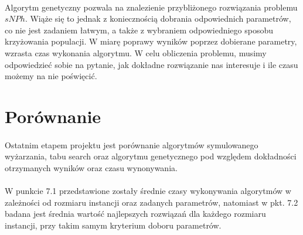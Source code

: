\documentclass[wide,a4paper,titlepage,12pt] {article}
\begin{document}
\paragraph{}
Algorytm genetyczny pozwala na znalezienie przybliżonego rozwiązania problemu $sNPh$. Wiąże się to jednak z koniecznością dobrania odpowiednich parametrów, co nie jest zadaniem łatwym, a także z wybraniem odpowiedniego sposobu krzyżowania populacji. W miarę poprawy wyników poprzez dobierane parametry, wzrasta czas wykonania algorytmu. W celu obliczenia problemu, musimy odpowiedzieć sobie na pytanie, jak dokładne rozwiązanie nas interesuje i ile czasu możemy na nie poświęcić.

\newpage
\section{Porównanie}
\paragraph{}
Ostatnim etapem projektu jest porównanie algorytmów symulowanego wyżarzania, tabu search oraz algorytmu genetycznego pod względem dokładności otrzymanych wyników oraz czasu wynonywania.

\paragraph{}
W punkcie 7.1 przedstawione zostały średnie czasy wykonywania algorytmów w zależności od rozmiaru instancji oraz zadanych parametrów, natomiast w pkt. 7.2 badana jest średnia wartość najlepszych rozwiązań dla każdego rozmiaru instancji, przy takim samym kryterium doboru parametrów.

\label{par:}
\end{document}
